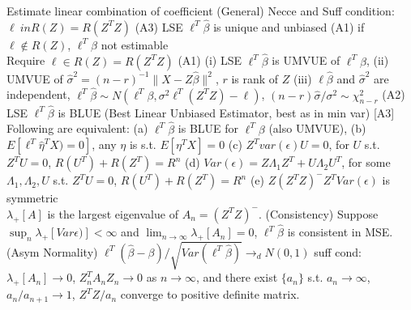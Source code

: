 \documentclass{article}
\renewcommand{\subsection}[1]{\text{\hl{[#1]}}}
\newcommand{\compact}{\\}
\begin{document}
\subsection{Inference}
Estimate linear combination of coefficient
(General) Necce and Suff condition: $\ell \ in R(Z) = R(Z^TZ)$
(A3) LSE $\ell^T \hat\beta$ is unique and unbiased
(A1) if $\ell\notin R(Z)$, $\ell^T\beta$ not estimable
\compact
\subsection{Properties}
Require $\ell \in R(Z) = R(Z^TZ)$
(A1)
(i) LSE $\ell^T\hat\beta$ is UMVUE of $\ell^T\beta$,
(ii) UMVUE of $\hat\sigma^2 = (n-r)^{-1}\lVert X - Z\hat\beta \rVert^2$,
$r$ is rank of $Z$
(iii) $\ell\hat\beta$ and $\hat\sigma^2$ are independent,
$\ell^T\hat\beta \sim N(\ell^T\beta, \sigma^2\ell^T(Z^TZ)-\ell)$,
$(n-r)\hat\sigma/\sigma^2\sim\chi_{n-r}^2$
(A2) LSE $\ell^T\hat\beta$ is BLUE (Best Linear Unbiased Estimator, best as in min var)
[A3] Following are equivalent:
(a) $\ell^T\hat\beta$ is BLUE for $\ell^T\beta$ (also UMVUE),
(b) $E[\ell^T\hat\eta^TX)=0]$, any $\eta$ is s.t. $E[\eta^TX]=0$
(c) $Z^T var(\epsilon) U = 0$, for $U$ s.t. $Z^TU = 0$, $R(U^T)+R(Z^T)=R^n$
(d) $Var(\epsilon) = Z\Lambda_1 Z^T + U \Lambda_2 U^T$,
for some $\Lambda_1, \Lambda_2, U$ s.t. $Z^TU = 0$, $R(U^T)+R(Z^T)=R^n$
(e) $Z(Z^TZ)^-Z^T Var(\epsilon)$ is symmetric
\compact
\subsection{Asymptotic}
$\lambda_+[A]$ is the largest eigenvalue of $A_n = (Z^TZ)^-$.
(Consistency)
Suppose $\sup_n \lambda_+ [Var\epsilon)] < \infty$ and
$\lim_{n\rightarrow\infty} \lambda_+ [A_n] = 0$,
$\ell^T\hat\beta$ is consistent in MSE.
(Asym Normality)
$\ell^T(\hat\beta-\beta)/\sqrt{Var(\ell^T\hat\beta)}\rightarrow_d N(0, 1)$
suff cond: $\lambda_+[A_n]\rightarrow 0$, $Z_n^T A_n Z_n \rightarrow 0$ as
$n\rightarrow\infty$, and
there exist $\{a_n\}$ s.t. $a_n\rightarrow \infty$, $a_n/a_{n+1}\rightarrow
    1$, $Z^TZ/a_n$ converge to positive definite matrix.
\compact
\end{document}
